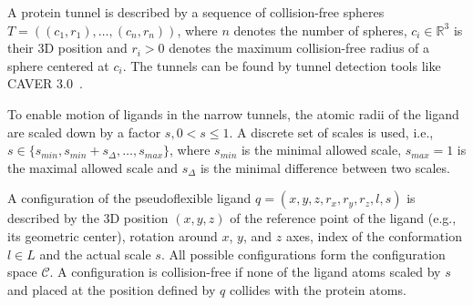 \documentclass{svmult}
\def\C{\mathcal{C}}
\def\CFD{{\mathcal{C}^s_{free}}}
\def\R{\mathbb{R}}
\def\smin{s_{min}}
\def\smax{s_{max}}
\def\sdelta{s_{\Delta}}
\def\L{L}
\begin{document}
A protein tunnel is described by a sequence of collision-free spheres 
$T=( (c_1, r_1),\ldots,(c_n,r_n) )$, where $n$ denotes the number of spheres,
$c_i \in \R^3$ is their 3D position and $r_i > 0$ denotes the maximum collision-free radius of a sphere centered at $c_i$. 
The tunnels can be found by tunnel detection tools like CAVER 3.0~\cite{caver3}.



To enable motion of ligands in the narrow tunnels, the atomic radii of the ligand are scaled down by a factor $s, 0 < s \le 1$.
A discrete set of scales is used, i.e., $s \in \{\smin, \smin+\sdelta, \ldots, \smax\}$, where 
$\smin$ is the minimal allowed scale, $\smax=1$ is the maximal allowed scale and $\sdelta$ is the minimal difference between two scales.

A configuration of the pseudoflexible ligand $q=(x,y,z,r_x,r_y,r_z,l,s)$  is described
by the 3D position $(x,y,z)$ of the reference point of the ligand (e.g., its geometric center), rotation around $x$, $y$, and $z$ axes,
index of the conformation $l\in \L$ and the actual scale $s$.
All possible configurations form the configuration space $\C$. 
A configuration is collision-free if none of the ligand atoms scaled by $s$ and placed at the
position defined by $q$ collides with the protein atoms.
\end{document}
